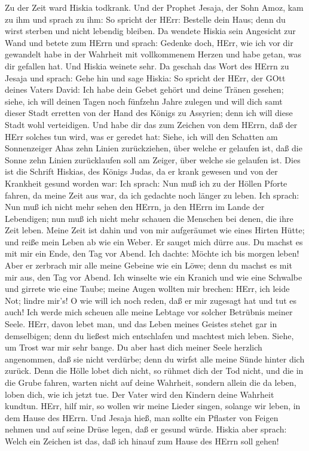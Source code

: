  Zu der Zeit ward Hiskia todkrank. Und der Prophet Jesaja,
der Sohn Amoz, kam zu ihm und sprach zu ihm: So spricht der HErr:
Bestelle dein Haus; denn du wirst sterben und nicht lebendig bleiben.
 Da wendete Hiskia sein Angesicht zur Wand und betete zum
HErrn  und sprach: Gedenke doch, HErr, wie ich vor dir
gewandelt habe in der Wahrheit mit vollkommenem Herzen und habe getan,
was dir gefallen hat. Und Hiskia weinete sehr.  Da geschah
das Wort des HErrn zu Jesaja und sprach:  Gehe hin und sage
Hiskia: So spricht der HErr, der GOtt deines Vaters David: Ich habe dein
Gebet gehört und deine Tränen gesehen; siehe, ich will deinen Tagen noch
fünfzehn Jahre zulegen  und will dich samt dieser Stadt
erretten von der Hand des Königs zu Assyrien; denn ich will diese Stadt
wohl verteidigen.  Und habe dir das zum Zeichen von dem
HErrn, daß der HErr solches tun wird, was er geredet hat: 
Siehe, ich will den Schatten am Sonnenzeiger Ahas zehn Linien
zurückziehen, über welche er gelaufen ist, daß die Sonne zehn Linien
zurücklaufen soll am Zeiger, über welche sie gelaufen ist. 
Dies ist die Schrift Hiskias, des Königs Judas, da er krank gewesen und
von der Krankheit gesund worden war:  Ich sprach: Nun muß
ich zu der Höllen Pforte fahren, da meine Zeit aus war, da ich gedachte
noch länger zu leben.  Ich sprach: Nun muß ich nicht mehr
sehen den HErrn, ja den HErrn im Lande der Lebendigen; nun muß ich nicht
mehr schauen die Menschen bei denen, die ihre Zeit leben. 
Meine Zeit ist dahin und von mir aufgeräumet wie eines Hirten Hütte; und
reiße mein Leben ab wie ein Weber. Er sauget mich dürre aus. Du machst
es mit mir ein Ende, den Tag vor Abend.  Ich dachte: Möchte
ich bis morgen leben! Aber er zerbrach mir alle meine Gebeine wie ein
Löwe; denn du machst es mit mir aus, den Tag vor Abend. 
Ich winselte wie ein Kranich und wie eine Schwalbe und girrete wie eine
Taube; meine Augen wollten mir brechen: HErr, ich leide Not; lindre
mir's!  O wie will ich noch reden, daß er mir zugesagt hat
und tut es auch! Ich werde mich scheuen alle meine Lebtage vor solcher
Betrübnis meiner Seele.  HErr, davon lebet man, und das
Leben meines Geistes stehet gar in demselbigen; denn du ließest mich
entschlafen und machtest mich leben.  Siehe, um Trost war
mir sehr bange. Du aber hast dich meiner Seele herzlich angenommen, daß
sie nicht verdürbe; denn du wirfst alle meine Sünde hinter dich zurück.
 Denn die Hölle lobet dich nicht, so rühmet dich der Tod
nicht, und die in die Grube fahren, warten nicht auf deine Wahrheit,
 sondern allein die da leben, loben dich, wie ich jetzt
tue. Der Vater wird den Kindern deine Wahrheit kundtun. 
HErr, hilf mir, so wollen wir meine Lieder singen, solange wir leben, in
dem Hause des HErrn.  Und Jesaja hieß, man sollte ein
Pflaster von Feigen nehmen und auf seine Drüse legen, daß er gesund
würde.  Hiskia aber sprach: Welch ein Zeichen ist das, daß
ich hinauf zum Hause des HErrn soll gehen!

